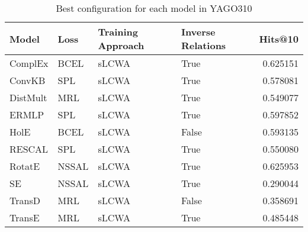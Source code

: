 \begin{table}
\centering
\caption{Best configuration for each model in YAGO310}
\label{best_models_yago310}
\begin{tabular}{llllr}
\toprule
    Model &   Loss & Training Approach & Inverse Relations &   Hits@10 \\
\midrule
  ComplEx &   BCEL &             sLCWA &              True &  0.625151 \\
   ConvKB &    SPL &             sLCWA &              True &  0.578081 \\
 DistMult &    MRL &             sLCWA &              True &  0.549077 \\
    ERMLP &    SPL &             sLCWA &              True &  0.597852 \\
     HolE &   BCEL &             sLCWA &             False &  0.593135 \\
   RESCAL &    SPL &             sLCWA &              True &  0.550080 \\
   RotatE &  NSSAL &             sLCWA &              True &  0.625953 \\
       SE &  NSSAL &             sLCWA &              True &  0.290044 \\
   TransD &    MRL &             sLCWA &             False &  0.358691 \\
   TransE &    MRL &             sLCWA &              True &  0.485448 \\
\bottomrule
\end{tabular}
\end{table}

